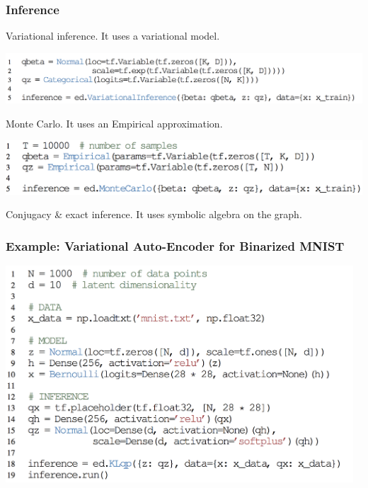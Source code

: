 \documentclass[10pt,
               xcolor={usenames,dvipsnames},
               hyperref={colorlinks,linktoc=all,citecolor=Plum,linkcolor=MidnightBlue,urlcolor=MidnightBlue},noamssymb]{beamer}
\begin{document}
\begin{frame}
\frametitle{Inference}
Variational inference. It uses a variational model.
\begin{center}
\vspace{-2.0ex}
\includegraphics[height=0.18\textheight]{img/inference_variational.png}
\end{center}
Monte Carlo. It uses an Empirical approximation.
\begin{center}
\includegraphics[height=0.17\textheight]{img/inference_monte.png}
\end{center}

Conjugacy \& exact inference. It uses symbolic algebra on the graph.
\end{frame}

\begin{frame}[t]
\frametitle{Example: Variational Auto-Encoder for Binarized MNIST}
\vspace{5ex}
\begin{center}
\includegraphics[width=0.975\textwidth]{img/vae_example.png}
\end{center}
\end{frame}
\end{document}
